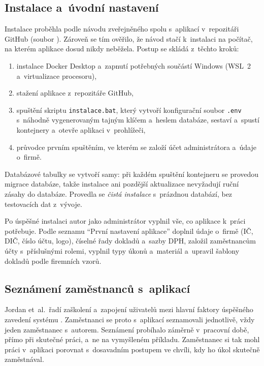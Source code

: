 \subsection{Instalace a~úvodní nastavení}

Instalace proběhla podle návodu zveřejněného spolu s~aplikací v~repozitáři GitHub (soubor ). Zároveň se tím ověřilo, že návod stačí k~instalaci na počítač, na kterém aplikace dosud nikdy neběžela. Postup se skládá z~těchto kroků:
\begin{enumerate}
\item instalace Docker Desktop a~zapnutí potřebných součástí Windows (WSL~2 a~virtualizace procesoru),
\item stažení aplikace z~repozitáře GitHub,
\item spuštění skriptu \texttt{instalace.bat}, který vytvoří konfigurační soubor \texttt{.env} s~náhodně vygenerovaným tajným klíčem a~heslem databáze, sestaví a~spustí kontejnery a~otevře aplikaci v~prohlížeči,
\item průvodce prvním spuštěním, ve kterém se založí účet administrátora a~údaje o~firmě.
\end{enumerate}

Databázové tabulky se vytvoří samy: při každém spuštění kontejneru se provedou migrace databáze, takže instalace ani pozdější aktualizace nevyžadují ruční zásahy do databáze. Provedla se \emph{čistá instalace} s~prázdnou databází, bez testovacích dat z~vývoje.

Po úspěšné instalaci autor jako administrátor vyplnil vše, co aplikace k~práci potřebuje. Podle seznamu \enquote{První nastavení aplikace} doplnil údaje o~firmě (IČ, DIČ, číslo účtu, logo), číselné řady dokladů a~sazby DPH, založil zaměstnancům účty s~příslušnými rolemi, vyplnil typy úkonů a~materiál a~upravil šablony dokladů podle firemních vzorů.

\subsection{Seznámení zaměstnanců s~aplikací}

Jordan et~al.\ řadí zaškolení a~zapojení uživatelů mezi hlavní faktory úspěšného zavedení systému \cite[s.~48]{Jordan2022}. Zaměstnanci se proto s~aplikací seznamovali jednotlivě, vždy jeden zaměstnanec s~autorem. Seznámení probíhalo záměrně v~pracovní době, přímo při skutečné práci, a~ne na vymyšleném příkladu. Zaměstnanec si tak mohl práci v~aplikaci porovnat s~dosavadním postupem ve chvíli, kdy ho úkol skutečně zaměstnával.

